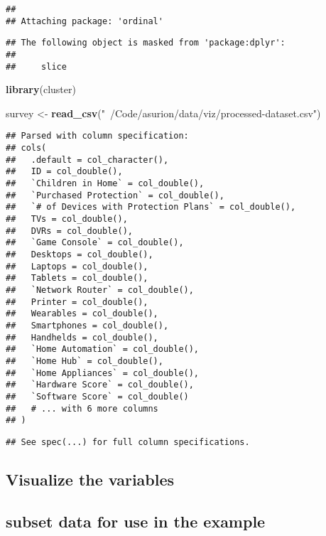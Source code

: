 \documentclass[]{article}
\newenvironment{Shaded}{\begin{snugshade}}{\end{snugshade}}
\newcommand{\KeywordTok}[1]{\textcolor[rgb]{0.13,0.29,0.53}{\textbf{{#1}}}}
\newcommand{\StringTok}[1]{\textcolor[rgb]{0.31,0.60,0.02}{{#1}}}
\newcommand{\NormalTok}[1]{{#1}}
\begin{document}
\begin{verbatim}
## 
## Attaching package: 'ordinal'
\end{verbatim}

\begin{verbatim}
## The following object is masked from 'package:dplyr':
## 
##     slice
\end{verbatim}

\begin{Shaded}
\begin{Highlighting}[]
\KeywordTok{library}\NormalTok{(cluster)}

\NormalTok{survey <-}\StringTok{ }\KeywordTok{read_csv}\NormalTok{(}\StringTok{"~/Code/asurion/data/viz/processed-dataset.csv"}\NormalTok{)}
\end{Highlighting}
\end{Shaded}

\begin{verbatim}
## Parsed with column specification:
## cols(
##   .default = col_character(),
##   ID = col_double(),
##   `Children in Home` = col_double(),
##   `Purchased Protection` = col_double(),
##   `# of Devices with Protection Plans` = col_double(),
##   TVs = col_double(),
##   DVRs = col_double(),
##   `Game Console` = col_double(),
##   Desktops = col_double(),
##   Laptops = col_double(),
##   Tablets = col_double(),
##   `Network Router` = col_double(),
##   Printer = col_double(),
##   Wearables = col_double(),
##   Smartphones = col_double(),
##   Handhelds = col_double(),
##   `Home Automation` = col_double(),
##   `Home Hub` = col_double(),
##   `Home Appliances` = col_double(),
##   `Hardware Score` = col_double(),
##   `Software Score` = col_double()
##   # ... with 6 more columns
## )
\end{verbatim}

\begin{verbatim}
## See spec(...) for full column specifications.
\end{verbatim}

\subsection{Visualize the variables}\label{visualize-the-variables}

\subsection{subset data for use in the
example}\label{subset-data-for-use-in-the-example}
\end{document}
